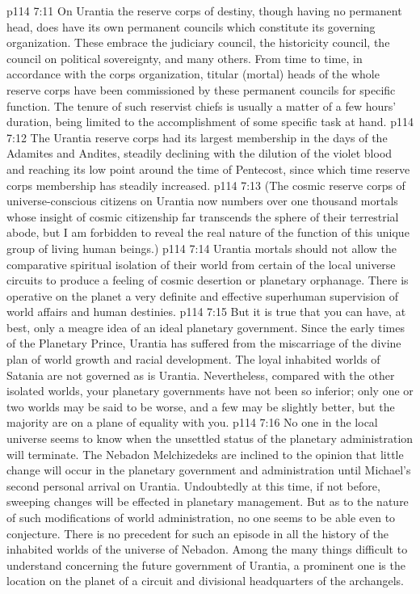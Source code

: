 \vs p114 7:11 On Urantia the reserve corps of destiny, though having no permanent head, does have its own permanent councils which constitute its governing organization. These embrace the judiciary council, the historicity council, the council on political sovereignty, and many others. From time to time, in accordance with the corps organization, titular (mortal) heads of the whole reserve corps have been commissioned by these permanent councils for specific function. The tenure of such reservist chiefs is usually a matter of a few hours’ duration, being limited to the accomplishment of some specific task at hand.
\vs p114 7:12 The Urantia reserve corps had its largest membership in the days of the Adamites and Andites, steadily declining with the dilution of the violet blood and reaching its low point around the time of Pentecost, since which time reserve corps membership has steadily increased.
\vs p114 7:13 \pc (The cosmic reserve corps of universe\hyp{}conscious citizens on Urantia now numbers over one thousand mortals whose insight of cosmic citizenship far transcends the sphere of their terrestrial abode, but I am forbidden to reveal the real nature of the function of this unique group of living human beings.)
\vs p114 7:14 \pc Urantia mortals should not allow the comparative spiritual isolation of their world from certain of the local universe circuits to produce a feeling of cosmic desertion or planetary orphanage. There is operative on the planet a very definite and effective superhuman supervision of world affairs and human destinies.
\vs p114 7:15 But it is true that you can have, at best, only a meagre idea of an ideal planetary government. Since the early times of the Planetary Prince, Urantia has suffered from the miscarriage of the divine plan of world growth and racial development. The loyal inhabited worlds of Satania are not governed as is Urantia. Nevertheless, compared with the other isolated worlds, your planetary governments have not been so inferior; only one or two worlds may be said to be worse, and a few may be slightly better, but the majority are on a plane of equality with you.
\vs p114 7:16 No one in the local universe seems to know when the unsettled status of the planetary administration will terminate. The Nebadon Melchizedeks are inclined to the opinion that little change will occur in the planetary government and administration until Michael’s second personal arrival on Urantia. Undoubtedly at this time, if not before, sweeping changes will be effected in planetary management. But as to the nature of such modifications of world administration, no one seems to be able even to conjecture. There is no precedent for such an episode in all the history of the inhabited worlds of the universe of Nebadon. Among the many things difficult to understand concerning the future government of Urantia, a prominent one is the location on the planet of a circuit and divisional headquarters of the archangels.
